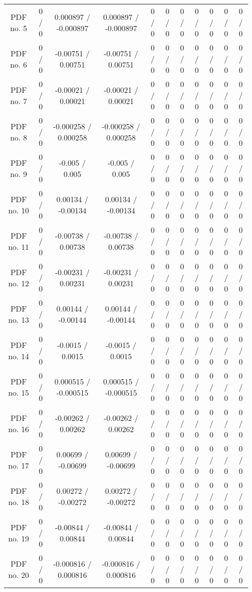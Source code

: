 \begin{table}[htbp]
\begin{center}
\begin{tabular}{|c|c|c|c|c|c|c|c|c|c|c|}
  PDF no. 5 & 0 / 0 & 0.000897 / -0.000897 & 0.000897 / -0.000897 & 0 / 0 & 0 / 0 & 0 / 0 & 0 / 0 & 0 / 0 & 0 / 0 & 0 / 0 \\ 
  PDF no. 6 & 0 / 0 & -0.00751 / 0.00751 & -0.00751 / 0.00751 & 0 / 0 & 0 / 0 & 0 / 0 & 0 / 0 & 0 / 0 & 0 / 0 & 0 / 0 \\ 
  PDF no. 7 & 0 / 0 & -0.00021 / 0.00021 & -0.00021 / 0.00021 & 0 / 0 & 0 / 0 & 0 / 0 & 0 / 0 & 0 / 0 & 0 / 0 & 0 / 0 \\ 
  PDF no. 8 & 0 / 0 & -0.000258 / 0.000258 & -0.000258 / 0.000258 & 0 / 0 & 0 / 0 & 0 / 0 & 0 / 0 & 0 / 0 & 0 / 0 & 0 / 0 \\ 
  PDF no. 9 & 0 / 0 & -0.005 / 0.005 & -0.005 / 0.005 & 0 / 0 & 0 / 0 & 0 / 0 & 0 / 0 & 0 / 0 & 0 / 0 & 0 / 0 \\ 
  PDF no. 10 & 0 / 0 & 0.00134 / -0.00134 & 0.00134 / -0.00134 & 0 / 0 & 0 / 0 & 0 / 0 & 0 / 0 & 0 / 0 & 0 / 0 & 0 / 0 \\ 
  PDF no. 11 & 0 / 0 & -0.00738 / 0.00738 & -0.00738 / 0.00738 & 0 / 0 & 0 / 0 & 0 / 0 & 0 / 0 & 0 / 0 & 0 / 0 & 0 / 0 \\ 
  PDF no. 12 & 0 / 0 & -0.00231 / 0.00231 & -0.00231 / 0.00231 & 0 / 0 & 0 / 0 & 0 / 0 & 0 / 0 & 0 / 0 & 0 / 0 & 0 / 0 \\ 
  PDF no. 13 & 0 / 0 & 0.00144 / -0.00144 & 0.00144 / -0.00144 & 0 / 0 & 0 / 0 & 0 / 0 & 0 / 0 & 0 / 0 & 0 / 0 & 0 / 0 \\ 
  PDF no. 14 & 0 / 0 & -0.0015 / 0.0015 & -0.0015 / 0.0015 & 0 / 0 & 0 / 0 & 0 / 0 & 0 / 0 & 0 / 0 & 0 / 0 & 0 / 0 \\ 
  PDF no. 15 & 0 / 0 & 0.000515 / -0.000515 & 0.000515 / -0.000515 & 0 / 0 & 0 / 0 & 0 / 0 & 0 / 0 & 0 / 0 & 0 / 0 & 0 / 0 \\ 
  PDF no. 16 & 0 / 0 & -0.00262 / 0.00262 & -0.00262 / 0.00262 & 0 / 0 & 0 / 0 & 0 / 0 & 0 / 0 & 0 / 0 & 0 / 0 & 0 / 0 \\ 
  PDF no. 17 & 0 / 0 & 0.00699 / -0.00699 & 0.00699 / -0.00699 & 0 / 0 & 0 / 0 & 0 / 0 & 0 / 0 & 0 / 0 & 0 / 0 & 0 / 0 \\ 
  PDF no. 18 & 0 / 0 & 0.00272 / -0.00272 & 0.00272 / -0.00272 & 0 / 0 & 0 / 0 & 0 / 0 & 0 / 0 & 0 / 0 & 0 / 0 & 0 / 0 \\ 
  PDF no. 19 & 0 / 0 & -0.00844 / 0.00844 & -0.00844 / 0.00844 & 0 / 0 & 0 / 0 & 0 / 0 & 0 / 0 & 0 / 0 & 0 / 0 & 0 / 0 \\ 
  PDF no. 20 & 0 / 0 & -0.000816 / 0.000816 & -0.000816 / 0.000816 & 0 / 0 & 0 / 0 & 0 / 0 & 0 / 0 & 0 / 0 & 0 / 0 & 0 / 0 \\ 

\end{tabular}
\end{center}
\end{table}

